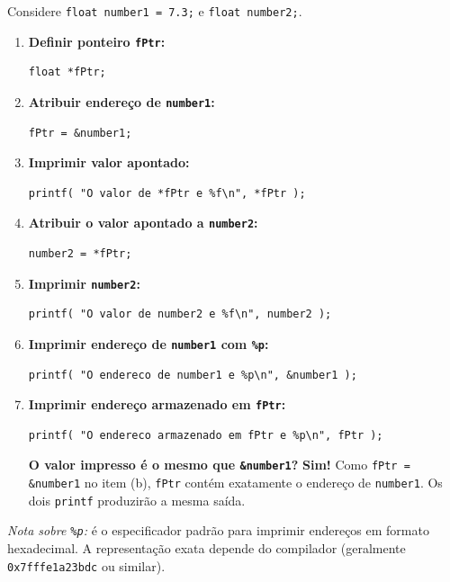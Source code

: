 \documentclass[12pt,a4paper]{article}
\begin{document}
\begin{respostabox}
Considere \texttt{float number1 = 7.3;} e \texttt{float number2;}.

\begin{enumerate}[label=\textbf{\alph*)}]

\item \textbf{Definir ponteiro \texttt{fPtr}:}
\begin{lstlisting}
float *fPtr;
\end{lstlisting}

\item \textbf{Atribuir endereço de \texttt{number1}:}
\begin{lstlisting}
fPtr = &number1;
\end{lstlisting}

\item \textbf{Imprimir valor apontado:}
\begin{lstlisting}
printf( "O valor de *fPtr e %f\n", *fPtr );
\end{lstlisting}

\item \textbf{Atribuir o valor apontado a \texttt{number2}:}
\begin{lstlisting}
number2 = *fPtr;
\end{lstlisting}

\item \textbf{Imprimir \texttt{number2}:}
\begin{lstlisting}
printf( "O valor de number2 e %f\n", number2 );
\end{lstlisting}

\item \textbf{Imprimir endereço de \texttt{number1} com \texttt{\%p}:}
\begin{lstlisting}
printf( "O endereco de number1 e %p\n", &number1 );
\end{lstlisting}

\item \textbf{Imprimir endereço armazenado em \texttt{fPtr}:}
\begin{lstlisting}
printf( "O endereco armazenado em fPtr e %p\n", fPtr );
\end{lstlisting}

\textbf{O valor impresso é o mesmo que \texttt{\&number1}?} \textbf{Sim!} Como
\texttt{fPtr = \&number1} no item (b), \texttt{fPtr} contém exatamente o endereço
de \texttt{number1}. Os dois \texttt{printf} produzirão a mesma saída.

\end{enumerate}

\textit{Nota sobre \texttt{\%p}:} é o especificador padrão para imprimir endereços
em formato hexadecimal. A representação exata depende do compilador (geralmente
\texttt{0x7fffe1a23bdc} ou similar).
\end{respostabox}
\end{document}
